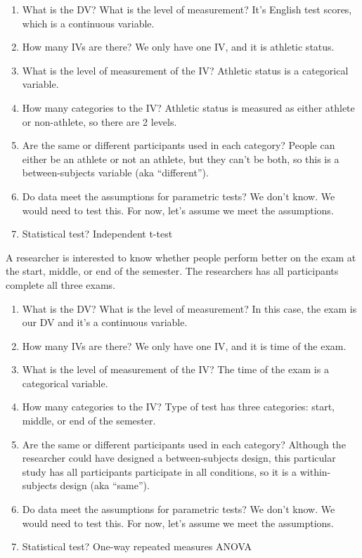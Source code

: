 \documentclass[
]{book}
\begin{document}
\begin{enumerate}
\def\labelenumi{\arabic{enumi}.}
\item
  What is the DV? What is the level of measurement? It's English test scores, which is a continuous variable.
\item
  How many IVs are there? We only have one IV, and it is athletic status.
\item
  What is the level of measurement of the IV? Athletic status is a categorical variable.
\item
  How many categories to the IV? Athletic status is measured as either athlete or non-athlete, so there are 2 levels.
\item
  Are the same or different participants used in each category? People can either be an athlete or not an athlete, but they can't be both, so this is a between-subjects variable (aka ``different'').
\item
  Do data meet the assumptions for parametric tests? We don't know. We would need to test this. For now, let's assume we meet the assumptions.
\item
  Statistical test? Independent t-test
\end{enumerate}

A researcher is interested to know whether people perform better on the exam at the start, middle, or end of the semester. The researchers has all participants complete all three exams.

\begin{enumerate}
\def\labelenumi{\arabic{enumi}.}
\item
  What is the DV? What is the level of measurement? In this case, the exam is our DV and it's a continuous variable.
\item
  How many IVs are there? We only have one IV, and it is time of the exam.
\item
  What is the level of measurement of the IV? The time of the exam is a categorical variable.
\item
  How many categories to the IV? Type of test has three categories: start, middle, or end of the semester.
\item
  Are the same or different participants used in each category? Although the researcher could have designed a between-subjects design, this particular study has all participants participate in all conditions, so it is a within-subjects design (aka ``same'').
\item
  Do data meet the assumptions for parametric tests? We don't know. We would need to test this. For now, let's assume we meet the assumptions.
\item
  Statistical test? One-way repeated measures ANOVA
\end{enumerate}
\end{document}
